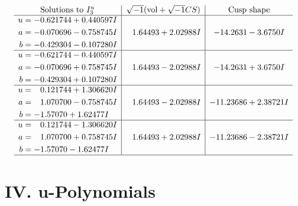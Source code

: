 \documentclass[1p]{elsarticle_modified}
\theoremstyle{definition}
\newcommand{\I}{\sqrt{-1}}
\begin{document}
$$\begin{array}{c|c|c}  
\text{Solutions to }I^u_{3}& \I (\text{vol} + \sqrt{-1}CS) & \text{Cusp shape}\\
 \hline 
\begin{aligned}
u &= -0.621744 + 0.440597 I \\
a &= -0.070696 - 0.758745 I \\
b &= -0.429304 - 0.107280 I\end{aligned}
 & \phantom{-}1.64493 + 2.02988 I & -14.2631 - 3.6750 I \\ \hline\begin{aligned}
u &= -0.621744 - 0.440597 I \\
a &= -0.070696 + 0.758745 I \\
b &= -0.429304 + 0.107280 I\end{aligned}
 & \phantom{-}1.64493 - 2.02988 I & -14.2631 + 3.6750 I \\ \hline\begin{aligned}
u &= \phantom{-}0.121744 + 1.306620 I \\
a &= \phantom{-}1.070700 - 0.758745 I \\
b &= -1.57070 + 1.62477 I\end{aligned}
 & \phantom{-}1.64493 - 2.02988 I & -11.23686 + 2.38721 I \\ \hline\begin{aligned}
u &= \phantom{-}0.121744 - 1.306620 I \\
a &= \phantom{-}1.070700 + 0.758745 I \\
b &= -1.57070 - 1.62477 I\end{aligned}
 & \phantom{-}1.64493 + 2.02988 I & -11.23686 - 2.38721 I\\
 \hline 
 \end{array}$$\newpage
\newpage\renewcommand{\arraystretch}{1}
\centering \section*{ IV. u-Polynomials}
\end{document}
